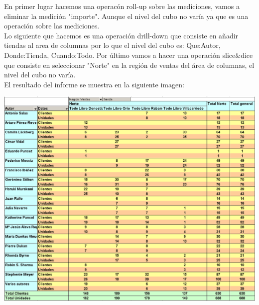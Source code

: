 \documentclass[paper=a4, fontsize=11pt, spanish]{scrartcl}
\numberwithin{equation}{section} %
\numberwithin{figure}{section} %
\numberwithin{table}{section} %
\begin{document}
En primer lugar hacemos una operacón roll-up sobre las mediciones, vamos a eliminar la medición "importe".
Aunque el nivel del cubo no varía ya que es una operación sobre las mediciones.\\
Lo siguiente que hacemos es una operación drill-down que consiste en añadir tiendas al area de columnas por lo que el nivel del cubo es:  Que:Autor, Donde:Tienda, Cuando:Todo.
Por último vamos a hacer una operación slice\&dice que consiste en seleccionar "Norte" en la región de ventas del área de columnas, el nivel del cubo no varía.\\

El resultado del informe se muestra en la siguiente imagen:
\begin{center}
	\includegraphics[scale=0.42]{img2.png}
\end{center}
\end{document}
